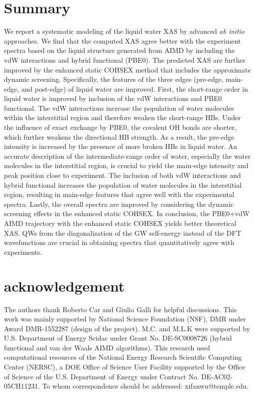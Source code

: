 \documentclass[prb,twocolumn,showpacs,preprintnumbers,superscriptaddress,amsmath,amssymb]{revtex4}
\begin{document}
\section{Summary}

We report a systematic modeling of the liquid water XAS
by advanced {\it ab initio} approaches.
We find that the computed XAS agree better with the experiment spectra
based on  the liquid structure generated from AIMD by
 including the vdW interactions and hybrid functional (PBE0).
The predicted XAS are further improved by the enhanced static COHSEX method
that includes the approximate dynamic screening.
Specifically, the features of the three edges (pre-edge, main-edge, and post-edge) of liquid water are improved.
First, the short-range order in liquid water is improved by inclusion of the vdW interactions and PBE0 functional.
The vdW interactions increase the population of water molecules within the interstitial region
and therefore weaken the short-range HBs.
Under the influence of exact exchange by PBE0,
the covalent OH bonds are shorter, which further weakens the directional HB strength.
As a result, the pre-edge intensity is increased by the presence of more broken HBs in liquid water.
An accurate description of the intermediate-range order of water,
especially the water molecules in the interstitial region,
is crucial to yield the main-edge intensity and peak position close to experiment.
The inclusion of both vdW interactions and hybrid functional increases the population of
water molecules in the interstitial region, resulting in main-edge features that agree well with the experimental spectra.
Lastly, the overall spectra are improved by considering the dynamic screening effects
in the enhanced static COHSEX.
In conclusion, the PBE0+vdW AIMD trajectory with the enhanced static COHSEX yields better theoretical XAS.
QWs
from the diagonalization of the GW self-energy instead of the DFT wavefunctions
are crucial in obtaining spectra that quantitatively agree with experiments.


\section{acknowledgement}
The authors thank Roberto Car and Giulia Galli for helpful discussions.
This work was mainly supported by National Science Foundation (NSF),
DMR under Award DMR-1552287 (design of the project).
M.C. and M.L.K were supported by U.S. Department of Energy Scidac under Grant No. DE-SC0008726 (hybrid functional and van der Waals AIMD algorithms).
This research used computational resources of the National Energy Research Scientific Computing Center (NERSC),
a DOE Office of Science User Facility supported by the Office of Science of the U.S. Department of Energy under Contract No. DE-AC02-05CH11231. To whom correspondence should be addressed: xifanwu@temple.edu.
\end{document}
